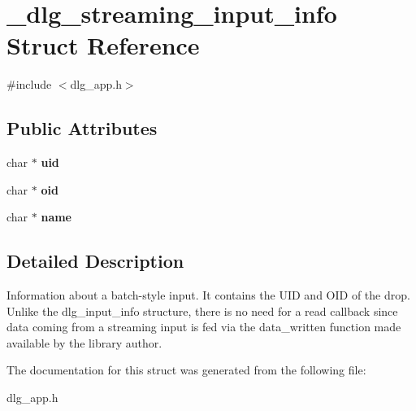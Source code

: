 \hypertarget{struct__dlg__streaming__input__info}{}\section{\+\_\+dlg\+\_\+streaming\+\_\+input\+\_\+info Struct Reference}
\label{struct__dlg__streaming__input__info}


{\ttfamily \#include $<$dlg\+\_\+app.\+h$>$}

\subsection*{Public Attributes}
\begin{DoxyCompactItemize}
\item 
\mbox{\label{struct__dlg__streaming__input__info_a189d19295d1c732ae25b1ba289216922}} 
char $\ast$ {\bfseries uid}
\item 
\mbox{\label{struct__dlg__streaming__input__info_a687590eba64f38c4759cba467ecf2d1b}} 
char $\ast$ {\bfseries oid}
\item 
\mbox{\label{struct__dlg__streaming__input__info_a893a421c06a83f58730b65634e27c9d9}} 
char $\ast$ {\bfseries name}
\end{DoxyCompactItemize}


\subsection{Detailed Description}
Information about a batch-\/style input. It contains the U\+ID and O\+ID of the drop. Unlike the dlg\+\_\+input\+\_\+info structure, there is no need for a read callback since data coming from a streaming input is fed via the data\+\_\+written function made available by the library author. 

The documentation for this struct was generated from the following file\+:\begin{DoxyCompactItemize}
\item 
dlg\+\_\+app.\+h\end{DoxyCompactItemize}
